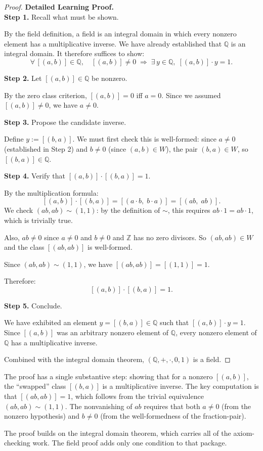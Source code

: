 \begin{proof}
\textbf{Detailed Learning Proof.}~\\

\textbf{Step 1.} Recall what must be shown.

By the field definition, a field is an integral domain in which every
nonzero element has a multiplicative inverse. We have already established
that $\mathbb{Q}$ is an integral domain. It therefore suffices to show:
\[
\forall\, [(a,b)]\in\mathbb{Q},\quad [(a,b)]\neq 0
\;\Longrightarrow\;
\exists\, y\in\mathbb{Q},\; [(a,b)]\cdot y = 1.
\]

\textbf{Step 2.} Let $[(a,b)]\in\mathbb{Q}$ be nonzero.

By the zero class criterion, $[(a,b)] = 0$ iff $a = 0$. Since we assumed
$[(a,b)]\neq 0$, we have $a\neq 0$.

\textbf{Step 3.} Propose the candidate inverse.

Define $y := [(b,a)]$. We must first check this is well-formed: since
$a\neq 0$ (established in Step 2) and $b\neq 0$ (since $(a,b)\in W$),
the pair $(b,a)\in W$, so $[(b,a)]\in\mathbb{Q}$.

\textbf{Step 4.} Verify that $[(a,b)]\cdot[(b,a)] = 1$.

By the multiplication formula:
\[
[(a,b)]\cdot[(b,a)]
= [(a\cdot b,\; b\cdot a)]
= [(ab,\; ab)].
\]
We check $(ab,ab)\sim(1,1)$: by the definition of $\sim$, this requires
$ab\cdot 1 = ab\cdot 1$, which is trivially true.

Also, $ab\neq 0$ since $a\neq 0$ and $b\neq 0$ and $\mathbb{Z}$ has no
zero divisors. So $(ab,ab)\in W$ and the class $[(ab,ab)]$ is well-formed.

Since $(ab,ab)\sim(1,1)$, we have $[(ab,ab)] = [(1,1)] = 1$.

Therefore:
\[
[(a,b)]\cdot[(b,a)] = 1.
\]

\textbf{Step 5.} Conclude.

We have exhibited an element $y = [(b,a)]\in\mathbb{Q}$ such that
$[(a,b)]\cdot y = 1$. Since $[(a,b)]$ was an arbitrary nonzero element
of $\mathbb{Q}$, every nonzero element of $\mathbb{Q}$ has a multiplicative
inverse.

Combined with the integral domain theorem, $(\mathbb{Q},+,\cdot,0,1)$ is
a field.
\end{proof}

\begin{remark*}
The proof has a single substantive step: showing that for a nonzero
$[(a,b)]$, the ``swapped'' class $[(b,a)]$ is a multiplicative inverse.
The key computation is that $[(ab,ab)] = 1$, which follows from the
trivial equivalence $(ab,ab)\sim(1,1)$. The nonvanishing of $ab$ requires
that both $a\neq 0$ (from the nonzero hypothesis) and $b\neq 0$ (from the
well-formedness of the fraction-pair).

The proof builds on the integral domain theorem, which carries all of the
axiom-checking work. The field proof adds only one condition to that package.
\end{remark*}


